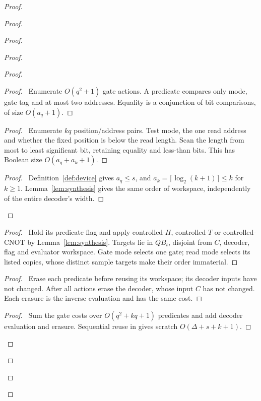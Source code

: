 \begin{proof}
\begin{proof}
\begin{proof}
\begin{proof}
\begin{proof}
  \begin{proof}\pf\ Enumerate $O(q^2+1)$ gate actions. A predicate
  compares only mode, gate tag and at most two addresses. Equality
  is a conjunction of bit comparisons, of size $O(a_q+1)$.\end{proof}
  \begin{proof}\pf\ Enumerate $kq$ position/address pairs. Test mode,
  the one read address and whether the fixed position is below the
  read length. Scan the length from most to least significant bit,
  retaining equality and less-than bits. This has Boolean size
  $O(a_q+a_k+1)$.\end{proof}
  \qedstep
  \begin{proof}\pf\ Definition~\ref{def:device} gives $a_q\leq s$,
  and $a_k=\lceil\log_2(k+1)\rceil\leq k$ for $k\geq1$.
  Lemma~\ref{lem:synthesis} gives the same order of workspace,
  independently of the entire decoder's width.\end{proof}
 \end{proof}
 \begin{proof}\pf\ Hold its predicate flag and apply controlled-$H$,
 controlled-$T$ or controlled-CNOT by Lemma~\ref{lem:synthesis}.
 Targets lie in $QB_t$, disjoint from $C$, decoder, flag and evaluator
 workspace. Gate mode selects one gate; read mode selects its listed
 copies, whose distinct sample targets make their order immaterial.
 \end{proof}
 \begin{proof}\pf\ Erase each predicate before reusing its workspace;
 its decoder inputs have not changed. After all actions erase the
 decoder, whose input $C$ has not changed. Each erasure is the
 inverse evaluation and has the same cost.\end{proof}
 \qedstep
 \begin{proof}\pf\ Sum the gate costs over
 $O(q^2+kq+1)$ predicates and add decoder evaluation and erasure.
 Sequential reuse in  gives
 scratch $O(\Delta+s+k+1)$.\end{proof}
\end{proof}

\end{proof}
\end{proof}
\end{proof}
